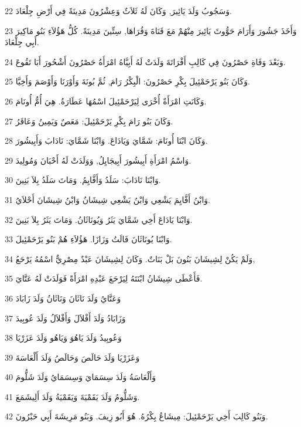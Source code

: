 \par 22 وَسَجُوبُ وَلَدَ يَائِيرَ, وَكَانَ لَهُ ثَلاَثٌ وَعِشْرُونَ مَدِينَةً فِي أَرْضِ جِلْعَادَ.
\par 23 وَأَخَذَ جَشُورَ وَأَرَامَ حَوُّوثَ يَائِيرَ مِنْهُمْ مَعَ قَنَاةَ وَقُرَاهَا, سِتِّينَ مَدِينَةً. كُلُّ هَؤُلاَءِ بَنُو مَاكِيرَ أَبِي جِلْعَادَ.
\par 24 وَبَعْدَ وَفَاةِ حَصْرُونَ فِي كَالِبِ أَفْرَاتَةَ وَلَدَتْ لَهُ أَبِيَّاهُ امْرَأَةُ حَصْرُونَ أَشْحُورَ أَبَا تَقُوعَ.
\par 25 وَكَانَ بَنُو يَرْحَمْئِيلَ بِكْرِ حَصْرُونَ: الْبِكْرُ رَامَ, ثُمَّ بُونَةَ وَأَوْرَنَا وَأَوْصَمَ وَأَخِيَّا.
\par 26 وَكَانَتِ امْرَأَةٌ أُخْرَى لِيَرْحَمْئِيلَ اسْمُهَا عَطَارَةُ. هِيَ أُمُّ أُونَامَ.
\par 27 وَكَانَ بَنُو رَامَ بِكْرِ يَرْحَمْئِيلَ: مَعَصٌ وَيَمِينُ وَعَاقَرُ.
\par 28 وَكَانَ ابْنَا أُونَامَ: شَمَّايَ وَيَادَاعَ. وَابْنَا شَمَّايَ: نَادَابَ وَأَبِيشُورَ.
\par 29 وَاسْمُ امْرَأَةِ أَبِيشُورَ أَبِيجَايِلُ, وَوَلَدَتْ لَهُ أَحْبَانَ وَمُولِيدَ.
\par 30 وَابْنَا نَادَابَ: سَلَدُ وَأَفَّايِمُ. وَمَاتَ سَلَدُ بِلاَ بَنِينَ.
\par 31 وَابْنُ أَفَّايِمَ يَشْعِي وَابْنُ يَشْعِي شِيشَانُ وَابْنُ شِيشَانَ أَحْلاَيُ.
\par 32 وَابْنَا يَادَاعَ أَخِي شَمَّايَ يَثَرُ وَيُونَاثَانُ. وَمَاتَ يَثَرُ بِلاَ بَنِينَ.
\par 33 وَابْنَا يُونَاثَانَ فَالَتُ وَزَازَا. هَؤُلاَءِ هُمْ بَنُو يَرْحَمْئِيلَ.
\par 34 وَلَمْ يَكُنْ لِشِيشَانَ بَنُونَ بَلْ بَنَاتٌ. وَكَانَ لِشِيشَانَ عَبْدٌ مِصْرِيٌّ اسْمُهُ يَرْحَعُ,
\par 35 فَأَعْطَى شِيشَانُ ابْنَتَهُ لِيَرْحَعَ عَبْدِهِ امْرَأَةً فَوَلَدَتْ لَهُ عَتَّايَ.
\par 36 وَعَتَّايُ وَلَدَ نَاثَانَ وَنَاثَانُ وَلَدَ زَابَادَ
\par 37 وَزَابَادُ وَلَدَ أَفْلاَلَ وَأَفْلاَلُ وَلَدَ عُوبِيدَ
\par 38 وَعُوبِيدُ وَلَدَ يَاهُوَ وَيَاهُو وَلَدَ عَزَرْيَا
\par 39 وَعَزَرْيَا وَلَدَ حَالَصَ وَحَالَصُ وَلَدَ أَلْعَاسَةَ
\par 40 وَأَلْعَاسَةُ وَلَدَ سِسَمَايَ وَسِسَمَايُ وَلَدَ شَلُّومَ
\par 41 وَشَلُّومُ وَلَدَ يَقَمْيَةَ وَيَقَمْيَةُ وَلَدَ أَلِيشَمَعَ.
\par 42 وَبَنُو كَالِبَ أَخِي يَرْحَمْئِيلَ: مِيشَاعُ بِكْرُهُ. هُوَ أَبُو زِيفَ. وَبَنُو مَرِيشَةَ أَبِي حَبْرُونَ.
